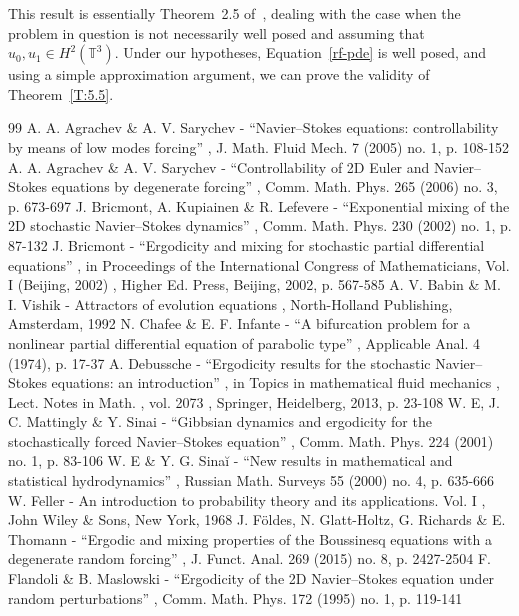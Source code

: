 \documentclass[11pt]{article}
\theoremstyle{plain}
\theoremstyle{definition}
\theoremstyle{plain}
\numberwithin{equation}{section}
\newcommand{\T}{{\mathbb T}}
\begin{document}
This result is essentially Theorem~2.5 of~\cite{nersesyan-2020}, dealing with the case when the problem in question is not necessarily well posed and assuming that $u_0,u_1\in H^2(\T^3)$. Under our hypotheses, Equation~\eqref{rf-pde} is well posed, and using a simple approximation argument, we can prove the validity of Theorem~\ref{T:5.5}.


\begin{thebibliography}{99}
 A. A. Agrachev \& A. V. Sarychev - “Navier–Stokes equations: controllability by means of low modes forcing” , J. Math. Fluid Mech. 7 (2005) no. 1, p. 108-152
 A. A. Agrachev \& A. V. Sarychev - “Controllability of 2D Euler and Navier–Stokes equations by degenerate forcing” , Comm. Math. Phys. 265 (2006) no. 3, p. 673-697
 J. Bricmont, A. Kupiainen \& R. Lefevere - “Exponential mixing of the 2D stochastic Navier–Stokes dynamics” , Comm. Math. Phys. 230 (2002) no. 1, p. 87-132
 J. Bricmont - “Ergodicity and mixing for stochastic partial differential equations” , in Proceedings of the International Congress of Mathematicians, Vol. I (Beijing, 2002) , Higher Ed. Press, Beijing, 2002, p. 567-585
 A. V. Babin \& M. I. Vishik - Attractors of evolution equations , North-Holland Publishing, Amsterdam, 1992
 N. Chafee \& E. F. Infante - “A bifurcation problem for a nonlinear partial differential equation of parabolic type” , Applicable Anal. 4 (1974), p. 17-37
 A. Debussche - “Ergodicity results for the stochastic Navier–Stokes equations: an introduction” , in Topics in mathematical fluid mechanics , Lect. Notes in Math. , vol. 2073 , Springer, Heidelberg, 2013, p. 23-108
 W. E, J. C. Mattingly \& Y. Sinai - “Gibbsian dynamics and ergodicity for the stochastically forced Navier–Stokes equation” , Comm. Math. Phys. 224 (2001) no. 1, p. 83-106
 W. E \& Y. G. Sinaĭ - “New results in mathematical and statistical hydrodynamics” , Russian Math. Surveys 55 (2000) no. 4, p. 635-666
 W. Feller - An introduction to probability theory and its applications. Vol. I , John Wiley \& Sons, New York, 1968
 J. Földes, N. Glatt-Holtz, G. Richards \& E. Thomann - “Ergodic and mixing properties of the Boussinesq equations with a degenerate random forcing” , J. Funct. Anal. 269 (2015) no. 8, p. 2427-2504
 F. Flandoli \& B. Maslowski - “Ergodicity of the 2D Navier–Stokes equation under random perturbations” , Comm. Math. Phys. 172 (1995) no. 1, p. 119-141

\end{thebibliography}
\end{document}
